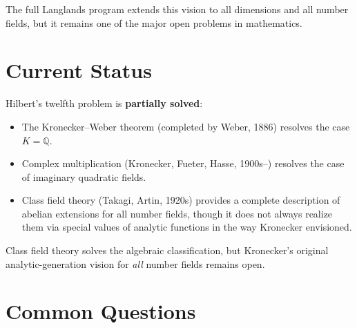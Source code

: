 The full Langlands program extends this vision to all dimensions and all number fields, but it remains one of the major open problems in mathematics.

\section{Current Status}

\begin{partiallybox}
Hilbert's twelfth problem is \textbf{partially solved}:
\begin{itemize}
    \item The Kronecker--Weber theorem (completed by Weber, 1886) resolves the case $K = \mathbb{Q}$.
    \item Complex multiplication (Kronecker, Fueter, Hasse, 1900s--) resolves the case of imaginary quadratic fields.
    \item Class field theory (Takagi, Artin, 1920s) provides a complete description of abelian extensions for all number fields, though it does not always realize them via special values of analytic functions in the way Kronecker envisioned.
\end{itemize}
Class field theory solves the algebraic classification, but Kronecker's original analytic-generation vision for \emph{all} number fields remains open.
\end{partiallybox}

\section*{Common Questions}

